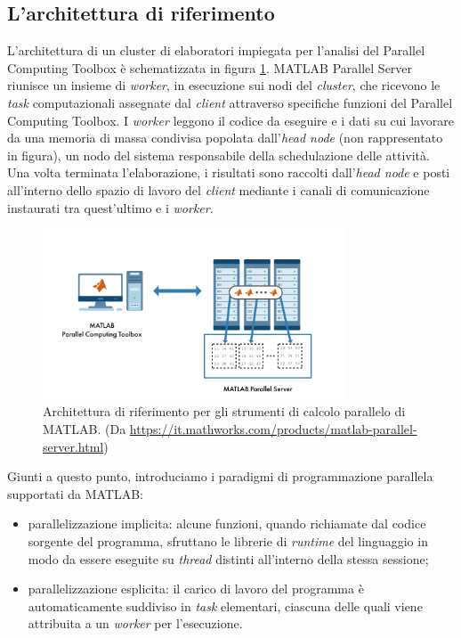 \subsection{L'architettura di riferimento}
L'architettura di un cluster di elaboratori impiegata per l'analisi del Parallel Computing Toolbox \`e schematizzata in figura \ref{fig:ArchitetturaRiferimento}.\newline
MATLAB Parallel Server riunisce un insieme di \textit{worker}, in esecuzione sui nodi del \textit{cluster}, che ricevono le 
\textit{task} computazionali assegnate dal \textit{client} attraverso specifiche funzioni del Parallel Computing Toolbox. \newline
I \textit{worker} leggono il codice da eseguire e i dati su cui lavorare da una memoria di massa condivisa popolata dall'\textit{head node} 
(non rappresentato in figura), un nodo del sistema responsabile della schedulazione delle attivit\`a.\newline
Una volta terminata l'elaborazione, i risultati sono raccolti dall'\textit{head node} e posti all'interno dello spazio di lavoro del \textit{client} 
mediante i canali di comunicazione instaurati tra quest'ultimo e i \textit{worker}.

\begin{figure}[htbp]
    \centering
    \includegraphics[width=0.8\textwidth]{../Immagini/Capitolo 2/ReferenceArchitecture.png}
    \caption{Architettura di riferimento per gli strumenti di calcolo parallelo di MATLAB. 
    \small{(Da \url{https://it.mathworks.com/products/matlab-parallel-server.html})}}
    \label{fig:ArchitetturaRiferimento}
\end{figure}

Giunti a questo punto, introduciamo i paradigmi di programmazione parallela supportati da MATLAB:
\begin{itemize}
    \item parallelizzazione implicita: alcune funzioni, quando richiamate dal codice sorgente del programma, sfruttano le librerie di \textit{runtime} del linguaggio 
    in modo da essere eseguite su \textit{thread} distinti all'interno della stessa sessione;
    \item parallelizzazione esplicita: il carico di lavoro del programma \`e automaticamente suddiviso in \textit{task} elementari, ciascuna delle quali viene 
    attribuita a un \textit{worker} per l'esecuzione.
\end{itemize}

